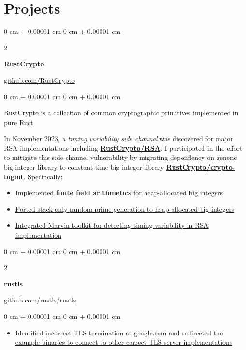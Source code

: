 \documentclass[10pt, letterpaper]{article}
\newenvironment{highlights}{
    \begin{itemize}[
        topsep=0.10 cm,
        parsep=0.10 cm,
        partopsep=0pt,
        itemsep=0pt,
        leftmargin=0 cm + 10pt
    ]
}{
    \end{itemize}
} %
\newenvironment{onecolentry}{
    \begin{adjustwidth}{
        0 cm + 0.00001 cm
    }{
        0 cm + 0.00001 cm
    }
}{
    \end{adjustwidth}
} %
\newenvironment{twocolentry}[2][]{
    \onecolentry
    \def\secondColumn{#2}
    \setcolumnwidth{\fill, 4.5 cm}
    \begin{paracol}{2}
}{
    \switchcolumn \raggedleft \secondColumn
    \end{paracol}
    \endonecolentry
} %
\begin{document}
    
    \section{Projects}
        \begin{twocolentry}
            {\href{https://github.com/RustCrypto}{github.com/RustCrypto}}
            {\textbf{RustCrypto}}
        \end{twocolentry}
        \vspace{0.1cm}
        \begin{onecolentry}
            RustCrypto is a collection of common cryptographic primitives implemented in pure Rust.
            \vspace{0.1cm}

            In November 2023, \href{https://people.redhat.com/~hkario/marvin/}{\emph{a timing variability side channel}} was discovered for major RSA implementations including \href{https://github.com/RustCrypto/RSA}{\textbf{RustCrypto/RSA}}. I participated in the effort to mitigate this side channel vulnerability by migrating dependency on generic big integer library to constant-time big integer library \href{https://github.com/RustCrypto/crypto-bigint}{\textbf{RustCrypto/crypto-bigint}}. Specifically:

            \begin{highlights}
                \item \href{https://github.com/RustCrypto/crypto-bigint/pulls?q=is%3Apr+is%3Aclosed+author%3Axuganyu96++is%3Amerged}{Implemented \textbf{finite field arithmetics} for heap-allocated big integers}
                \item \href{https://github.com/entropyxyz/crypto-primes/pull/40}{Ported stack-only random prime generation to heap-allocated big integers}
                \item \href{https://github.com/RustCrypto/RSA/pull/400}{Integrated Marvin toolkit for detecting timing variability in RSA implementation} 
            \end{highlights}
        \end{onecolentry}
        \vspace{0.2cm}

        \begin{twocolentry}
            {\href{https://github.com/rustls/rustls}{github.com/rustls/rustls}}
            \textbf{rustls}
        \end{twocolentry}
        \vspace{0.1cm}
        \begin{onecolentry}
            \begin{highlights}
               \item \href{https://github.com/rustls/rustls/pull/1328}{Identified incorrect TLS termination at google.com and redirected the example binaries to connect to other correct TLS server implementations} 
            \end{highlights}
        \end{onecolentry}
        \vspace{0.2cm}
\end{document}
